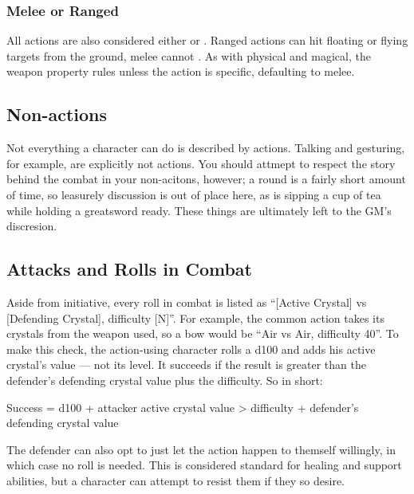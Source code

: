 \begin{multicols}{2}
        \subsubsection{Melee or Ranged}
            All actions  are also considered either  or . Ranged actions can hit floating or flying targets from the ground, melee cannot . As with physical and magical, the weapon property rules unless the action is specific, defaulting to melee.

    \subsection{Non-actions}
        Not everything a character can do is described by actions. Talking and gesturing, for example, are explicitly not actions. You should attmept to respect the story behind the combat in your non-acitons, however; a round is a fairly short amount of time, so leasurely discussion is out of place here, as is sipping a cup of tea while holding a greatsword ready. These things are ultimately left to the GM's discresion.

    \subsection{Attacks and Rolls in Combat}\label{subsec:attacks}
        Aside from initiative, every roll in combat is listed as ``[Active Crystal] vs [Defending Crystal], difficulty [N]''. For example, the common action  takes its crystals from the weapon used, so a bow would be ``Air vs Air, difficulty 40''. To make this check, the action-using character rolls a d100 and adds his active crystal's value --- not its level. It succeeds if the result is greater than the defender's defending crystal value plus the difficulty. So in short:

        Success = d100 + attacker active crystal value > difficulty + defender's defending crystal value

        The defender can also opt to just let the action happen to themself willingly, in which case no roll is needed. This is considered standard for healing and support abilities, but a character can attempt to resist them if they so desire.


\end{multicols}
